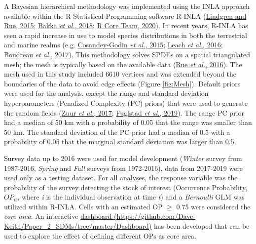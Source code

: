 \documentclass[
]{article}
\begin{document}
A Bayesian hierarchical methodology was implemented using the INLA approach available within the R Statistical Programming software R-INLA (\protect\hyperlink{ref-lindgrenBayesianSpatialModelling2015}{Lindgren and Rue, 2015}; \protect\hyperlink{ref-bakkaSpatialModellingRINLA2018}{Bakka \emph{et al.}, 2018}; \protect\hyperlink{ref-rcoreteamLanguageEnvironmentStatistical2020}{R Core Team, 2020}). In recent years, R-INLA has seen a rapid increase in use to model species distributions in both the terrestrial and marine realms (e.g. \protect\hyperlink{ref-cosandey-godinApplyingBayesianSpatiotemporal2015}{Cosandey-Godin \emph{et al.}, 2015}; \protect\hyperlink{ref-leachModellingInfluenceBiotic2016}{Leach \emph{et al.}, 2016}; \protect\hyperlink{ref-boudreauConnectivityPersistenceLoss2017}{Boudreau \emph{et al.}, 2017}). This methodology solves SPDEs on a spatial triangulated mesh; the mesh is typically based on the available data (\protect\hyperlink{ref-rueBayesianComputingINLA2016}{Rue \emph{et al.}, 2016}). The mesh used in this study included 6610 vertices and was extended beyond the boundaries of the data to avoid edge effects (Figure \ref{fig:Mesh}). Default priors were used for the analysis, except the range and standard deviation hyperparameters (Penalized Complexity (PC) priors) that were used to generate the random fields (\protect\hyperlink{ref-zuurBeginnerGuideSpatial2017}{Zuur \emph{et al.}, 2017}; \protect\hyperlink{ref-fuglstadConstructingPriorsThat2019}{Fuglstad \emph{et al.}, 2019}). The range PC prior had a median of 50 km with a probability of 0.05 that the range was smaller than 50 km. The standard deviation of the PC prior had a median of 0.5 with a probability of 0.05 that the marginal standard deviation was larger than 0.5.

Survey data up to 2016 were used for model development (\emph{Winter} survey from 1987-2016, \emph{Spring} and \emph{Fall} surveys from 1972-2016), data from 2017-2019 were used only as a testing dataset. For all analyses, the response variable was the probability of the survey detecting the stock of interest (Occurrence Probability, \(OP_{it}\), where \emph{i} is the individual observation at time \emph{t}) and a \emph{Bernoulli} GLM was utilized within R-INLA. Cells with an estimated OP \(\geq\) 0.75 were considered the \emph{core area}. An interactive \href{https://github.com/Dave-Keith/Paper_2_SDMs/tree/master/Dashboard}{dashboard (https://github.com/Dave-Keith/Paper\_2\_SDMs/tree/master/Dashboard)} has been developed that can be used to explore the effect of defining different OPs as core area.
\end{document}
